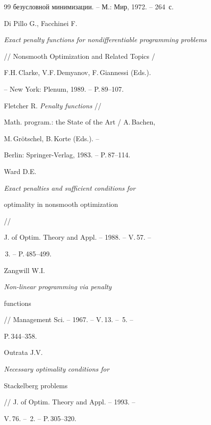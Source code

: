 \begin{thebibliography}{99}
{безусловной минимизации}. -- М.: Мир, 1972. -- 264~с.







Di Pillo G., Facchinei F.


{\it Exact penalty functions for nondifferentiable programming problems}


// Nonsmooth Optimization and Related Topics /


F.H.\,Clarke, V.F.\,Demyanov, F.\,Giannessi (Eds.).


-- New York: Plenum, 1989. -- P.\,89--107.







Fletcher R. {\it Penalty functions} //


Math. program.: the State of the Art / A.\,Bachen,


M.\,Gr\"otschel, B.\,Korte (Eds.). --


Berlin: Springer-Verlag, 1983. -- P.\,87--114.







Ward D.E. {\it Exact penalties and sufficient conditions for


optimality in nonsmooth optimization} //


J. of Optim. Theory and Appl. -- 1988. -- V.\,57. --


\No\,3. -- P.\,485--499.







Zangwill W.I. {\it Non-linear programming via penalty


functions} // Management Sci. -- 1967. -- V.\,13. -- \No\,5. --


P.\,344--358.







Outrata J.V. {\it Necessary optimality conditions for


Stackelberg problems} // J. of Optim. Theory and Appl. -- 1993. --


V.\,76. -- \No\,2. -- P.\,305--320.








\end{thebibliography}
